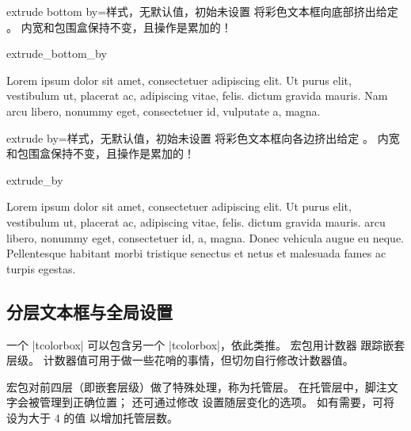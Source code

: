 \begin{docTcbKey}{extrude bottom by}{=}{样式，无默认值，初始未设置}
  将彩色文本框向底部挤出给定 。
  内宽和包围盒保持不变，且操作是累加的！
\begin{exdispExample}[safety=1cm]{extrude_bottom_by}

Lorem ipsum dolor sit amet, consectetuer adipiscing elit. Ut purus elit,
vestibulum ut, placerat ac, adipiscing vitae, felis.
 dictum gravida mauris.
Nam arcu libero, nonummy eget, consectetuer id, vulputate a, magna.
\end{exdispExample}
\end{docTcbKey}

\begin{docTcbKey}{extrude by}{=}{样式，无默认值，初始未设置}
  将彩色文本框向各边挤出给定 。
  内宽和包围盒保持不变，且操作是累加的！
\begin{exdispExample}{extrude_by}

Lorem ipsum dolor sit amet, consectetuer adipiscing elit. Ut purus elit,
vestibulum ut, placerat ac, adipiscing vitae, felis.  dictum
gravida mauris. 
arcu libero, nonummy eget, consectetuer id,  a, magna. Donec
vehicula augue eu neque. Pellentesque habitant morbi tristique senectus et netus
et malesuada fames ac turpis egestas. 
\end{exdispExample}
\end{docTcbKey}

\clearpage
\subsection{分层文本框与全局设置}\label{subsec:everybox}
一个 |tcolorbox| 可以包含另一个 |tcolorbox|，依此类推。
宏包用计数器  跟踪嵌套层级。
计数器值可用于做一些花哨的事情，但切勿自行修改计数器值。

宏包对前四层（即嵌套层级）做了特殊处理，称为托管层。
在托管层中，脚注文字会被管理到正确位置；
还可通过修改  设置随层变化的选项。
如有需要，可将  设为大于 4 的值
以增加托管层数。

